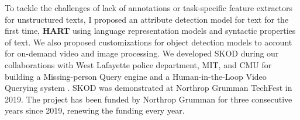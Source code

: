 %
%
To tackle the challenges of lack of annotations or task-specific feature extractors for unstructured texts, I proposed an attribute detection model for text for the first time, \textbf{HART} \cite{solaiman2022femmir} using language representation models and syntactic properties of text. We also proposed customizations \cite{stonebraker2020surveillance} for object detection models to account for on-demand video and image processing.
We developed SKOD during our collaborations with West Lafayette police department, MIT, and CMU for building a Missing-person Query engine \cite{solaiman2021applying} and a Human-in-the-Loop Video Querying system \cite{stonebraker2020surveillance}. SKOD was demonstrated at Northrop Grumman TechFest in 2019. The project has been funded by Northrop Grumman for three consecutive years since 2019, renewing the funding every year.